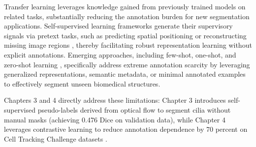 \documentclass[./dissertation.tex]{subfiles}
\begin{document}
Transfer learning leverages knowledge gained from previously trained models on related tasks, substantially reducing the annotation burden for new segmentation applications. Self-supervised learning frameworks generate their supervisory signals via pretext tasks, such as predicting spatial positioning or reconstructing missing image regions \cite{chen2020simple}, thereby facilitating robust representation learning without explicit annotations. Emerging approaches, including few-shot, one-shot, and zero-shot learning \cite{zhao2023one}, specifically address extreme annotation scarcity by leveraging generalized representations, semantic metadata, or minimal annotated examples to effectively segment unseen biomedical structures.

Chapters 3 and 4 directly address these limitations: Chapter 3 introduces self-supervised pseudo-labels derived from optical flow to segment cilia without manual masks (achieving 0.476 Dice on validation data), while Chapter 4 leverages contrastive learning to reduce annotation dependence by 70 percent on Cell Tracking Challenge datasets \cite{mavska2023cell}.

\end{document}
